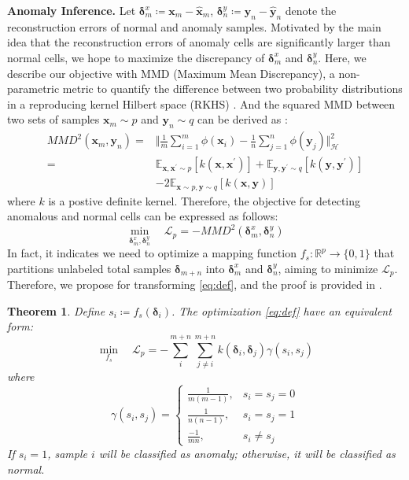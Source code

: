 \documentclass{article}
\newtheorem{theorem}{Theorem}[section]
\begin{document}
\textbf{Anomaly Inference.} Let $\bm{\delta}_m^x \coloneqq \bm{x}_m - \widehat{\bm{x}}_m$, $\bm{\delta}_n^y \coloneqq \bm{y}_n - \widehat{\bm{y}}_n$
denote the reconstruction errors of normal and anomaly samples.
Motivated by the main idea that the reconstruction errors of anomaly cells are significantly larger than normal cells,
we hope to maximize the discrepancy of $\bm{\delta}_m^x$ and $\bm{\delta}_n^y$.
Here, we describe our objective with MMD (Maximum Mean Discrepancy), a non-parametric metric to quantify the difference between two probability distributions in a reproducing kernel Hilbert space (RKHS) \cite{kolouri2016sliced,gretton2012kernel}.
And the squared MMD between two sets of samples $\bm{x}_m \sim p$ and $\bm{y}_n \sim q$ can be derived as \cite{gretton2012kernel}:
\begin{equation}\label{eq:MMD}
    \begin{aligned}
        MMD^2\left(\bm{x}_m, \bm{y}_n\right) = & \Vert \frac{1}{m}\sum_{i=1}^{m}\phi(\bm{x}_i) -  \frac{1}{n}\sum_{j=1}^{n}\phi(\bm{y}_j)\Vert_{\mathcal{H}}^2 \\
        =  &\mathbb{E}_{\bm{x}, \bm{x}^{\prime} \sim p}\left[k(\bm{x}, \bm{x}^{\prime})\right] +
        \mathbb{E}_{\bm{y}, \bm{y}^{\prime} \sim q}\left[k(\bm{y}, \bm{y}^{\prime})\right] \\
        & - 2\mathbb{E}_{\bm{x} \sim p, \bm{y} \sim q}\left[k(\bm{x}, \bm{y})\right]
    \end{aligned}
\end{equation}
where $k$ is a postive definite kernel.
Therefore, the objective for detecting anomalous and normal cells can be expressed as follows:
\begin{equation}\label{eq:def}
        \min_{\bm{\delta}_m^x, \bm{\delta}_n^y} \quad \mathcal{L}_p =  -MMD^2\left(\bm{\delta}_m^x, \bm{\delta}_n^y\right)
\end{equation}
In fact, it indicates we need to optimize a mapping function $f_s: \mathbb{R}^p \rightarrow \{0, 1\}$ that partitions unlabeled total samples $\bm{\delta}_{m+n}$ into $\bm{\delta}_m^x$ and $\bm{\delta}_n^y$, aiming to minimize $\mathcal{L}_p$.
Therefore, we propose  for transforming \eqref{eq:def}, and the proof is provided in .
\begin{theorem}\label{th:opt_s}
Define $s_i \coloneqq f_s(\bm{\delta}_i)$. The optimization \eqref{eq:def} have an equivalent form:
\begin{equation}\label{eq:def_s}
    \min_{f_s} \quad \mathcal{L}_p = -\sum_{i}^{m+n}\sum_{j\neq i}^{m+n} k(\bm{\delta}_i, \bm{\delta}_j) \gamma(s_i, s_j)
\end{equation}
where
\begin{equation}\label{eq:gamma}
    \gamma(s_i, s_j) = 
    \begin{cases}
        \frac{1}{m(m-1)}, & s_i = s_j = 0 \\
        \frac{1}{n(n-1)}, & s_i = s_j = 1 \\
        \frac{-1}{mn}, & s_i \neq s_j
    \end{cases}
\end{equation}
If $s_i = 1$, sample $i$ will be classified as anomaly; otherwise, it will be classified as normal. 
\end{theorem}
\end{document}
